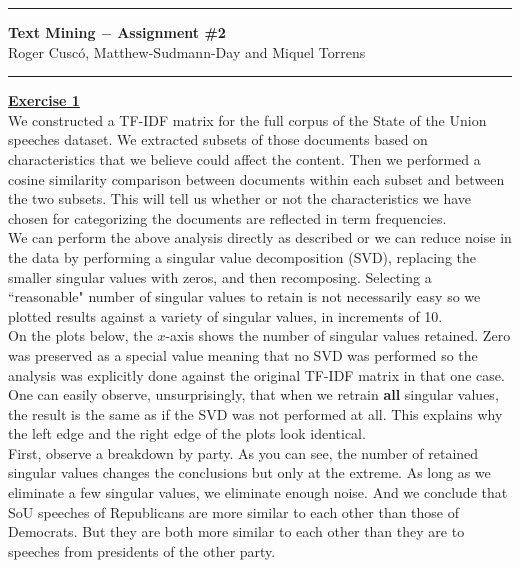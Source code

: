 \documentclass[a4paper, 11pt]{article}
\newcommand{\header}[2]{
\begin{flushleft}
		\rule{\linewidth}{0.6pt}
		\vspace{0.01cm}
		
		{\large{#1}}\\
		\vspace{0.1in}
		{#2}\\
		\vspace{0.1in}
		
		\rule{\linewidth}{0.6pt}
\end{flushleft}
}
\begin{document}
\header{\textbf{Text Mining $-$ Assignment \#2}}{Roger Cuscó, Matthew-Sudmann-Day and Miquel Torrens}
\textbf{\underline{Exercise 1}}\\
\newline We constructed a TF-IDF matrix for the full corpus of the State of the Union speeches dataset. We extracted subsets of those documents based on characteristics that we believe could affect the content. Then we performed a cosine similarity comparison between documents within each subset and between the two subsets. This will tell us whether or not the characteristics we have chosen for categorizing the documents are reflected in term frequencies.\\
\newline We can perform the above analysis directly as described or we can reduce noise in the data by performing a singular value decomposition (SVD), replacing the smaller singular values with zeros, and then recomposing. Selecting a ``reasonable" number of singular values to retain is not necessarily easy so we plotted results against a variety of singular values, in increments of 10.\\
\newline On the plots below, the $x$-axis shows the number of singular values retained. Zero was preserved as a special value meaning that no SVD was performed so the analysis was explicitly done against the original TF-IDF matrix in that one case. One can easily observe, unsurprisingly, that when we retrain \textbf{all} singular values, the result is the same as if the SVD was not performed at all. This explains why the left edge and the right edge of the plots look identical.\\
\newline First, observe a breakdown by party. As you can see, the number of retained singular values changes the conclusions but only at the extreme. As long as we eliminate a few singular values, we eliminate enough noise. And we conclude that SoU speeches of Republicans are more similar to each other than those of Democrats. But they are both more similar to each other than they are to speeches from presidents of the other party.
\end{document}
